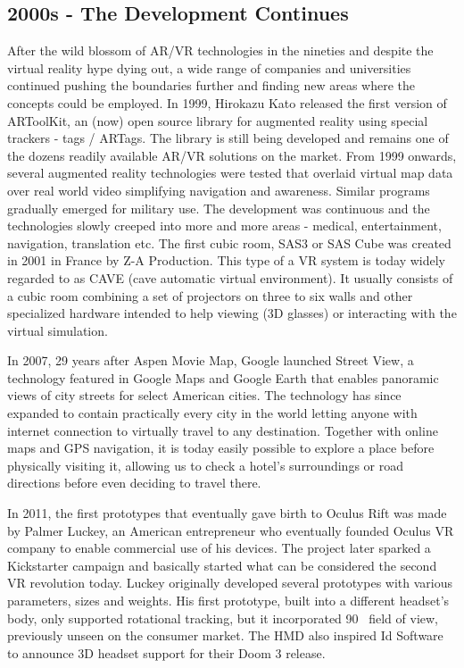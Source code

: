 \documentclass[12pt, a4paper]{article}
\begin{document}
\subsection{2000s - The Development Continues}
After the wild blossom of AR/VR technologies in the nineties and despite the virtual reality hype dying out, a wide range of companies and universities continued pushing the boundaries further and finding new areas where the concepts could be employed. In 1999, Hirokazu Kato released the first version of ARToolKit, an (now) open source library for augmented reality using special trackers - tags / ARTags. The library is still being developed and  remains one of the dozens readily available AR/VR solutions on the market. From 1999 onwards, several augmented reality technologies were tested that overlaid virtual map data over real world video simplifying navigation and awareness. Similar programs gradually emerged for military use. The development was continuous and the technologies slowly creeped into more and more areas - medical, entertainment, navigation, translation etc. The first cubic room, SAS3 or SAS Cube was created in 2001 in France by Z-A Production. This type of a VR system is today widely regarded to as CAVE (cave automatic virtual environment). It usually consists of a cubic room combining a set of projectors on three to six walls and other specialized hardware intended to help viewing (3D glasses) or interacting with the virtual simulation.

In 2007, 29 years after Aspen Movie Map, Google launched Street View, a technology featured in Google Maps and Google Earth that enables panoramic views of city streets for select American cities. The technology has since expanded to contain practically every city in the world letting anyone with internet connection to virtually travel to any destination. Together with online maps and GPS navigation, it is today easily possible to explore a place before physically visiting it, allowing us to check a hotel’s surroundings or road directions before even deciding to travel there.

In 2011, the first prototypes that eventually gave birth to Oculus Rift was made by Palmer Luckey, an American entrepreneur who eventually founded Oculus VR company to enable commercial use of his devices. The project later sparked a Kickstarter campaign and basically started what can be considered the second VR revolution today. Luckey originally developed several prototypes with various parameters, sizes and weights. His first prototype, built into a different headset’s body, only supported rotational tracking, but it incorporated 90\degree~ field of view, previously unseen on the consumer market. The HMD also inspired Id Software to announce 3D headset support for their Doom 3 release.
\end{document}
